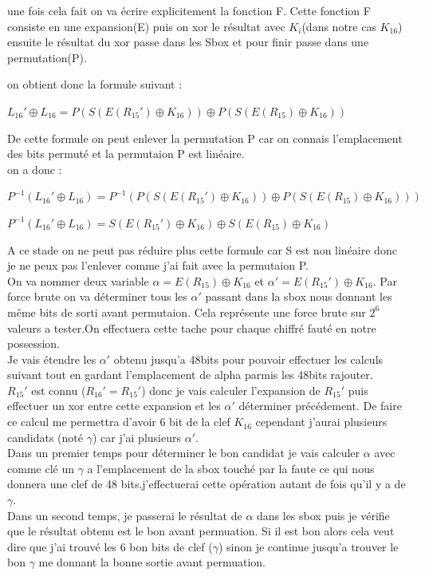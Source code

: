 \documentclass[a4paper]{report}
\begin{document}
			une fois cela fait on va écrire explicitement la fonction F. Cette fonction F consiste en une expansion(E) puis on xor le résultat avec $K_i$(dans notre cas $K_{16}$) ensuite le résultat du xor passe dans les Sbox et pour finir passe dans une permutation(P). 
			\begin{figure}[h]
			\end{figure}
			on obtient donc la formule suivant :
			\begin{center}$L_{16}'\oplus L_{16} = P(S(E(R_{15}')\oplus K_{16}))\oplus P(S(E(R_{15})\oplus K_{16})) $\end{center}
			
			De cette formule on peut enlever la permutation P car on connais l'emplacement des bits permuté et la permutaion P est linéaire.\\
			on a donc :
			\begin{center}$P^{-1}(L_{16}'\oplus L_{16}) =P^{-1}( P(S(E(R_{15}')\oplus K_{16}))\oplus P(S(E(R_{15})\oplus K_{16}))) $\end{center}
			\begin{center}$P^{-1}(L_{16}'\oplus L_{16}) =S(E(R_{15}')\oplus K_{16})\oplus S(E(R_{15})\oplus K_{16}) $\end{center}
			
			A ce stade on ne peut pas réduire plus cette formule car S est non linéaire donc je ne peux pas l'enlever comme j'ai fait avec la permutaion P.\\
			On va nommer deux variable $\alpha = E(R_{15})\oplus K_{16}$ et $\alpha' = E(R_{15}')\oplus K_{16}$.
			Par force brute on va déterminer tous les $\alpha'$ passant dans la sbox nous donnant les même bits de sorti avant permutaion. Cela représente une force brute sur $2^{6}$valeurs a tester.On effectuera cette tache pour chaque chiffré fauté en notre possession.\\
			Je vais étendre les $\alpha'$ obtenu jusqu'a 48bits pour pouvoir effectuer les calculs suivant tout en gardant l'emplacement de alpha parmis les 48bits rajouter.\\
			$R_{15}'$ est connu ($R_{16}'=R_{15}'$) donc je vais calculer l'expansion de $R_{15}'$ puis effectuer un xor entre cette expansion et les $\alpha'$ déterminer précédement. De faire ce calcul me permettra d'avoir 6 bit de la clef $K_{16}$ cependant j'aurai plusieurs candidats (noté $\gamma$) car j'ai plusieurs $\alpha'$.\\
			Dans un premier temps pour déterminer le bon candidat je vais calculer $\alpha$ avec comme clé un $\gamma$ a l'emplacement de la sbox touché par la faute ce qui nous donnera une clef de 48 bits.j'effectuerai cette opération autant de fois qu'il y a de $\gamma$.\\
			Dans un second temps, je passerai le résultat de $\alpha$ dans les sbox puis je vérifie que le résultat obtenu est le bon avant permuation. Si il est bon alors cela veut dire que j'ai trouvé les 6 bon bits de clef ($\gamma$) sinon je continue jusqu'a trouver le bon $\gamma$ me donnant la bonne sortie avant permuation.\\
			
\end{document}

